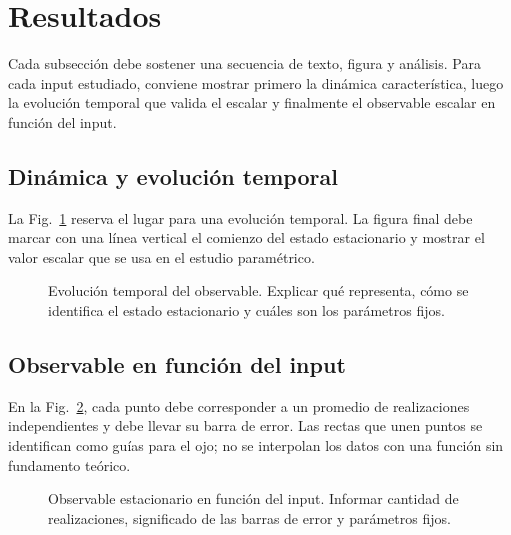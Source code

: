\documentclass[11pt,a4paper]{article}
\begin{document}
\section{Resultados}

Cada subsección debe sostener una secuencia de texto, figura y análisis. Para
cada input estudiado, conviene mostrar primero la dinámica característica,
luego la evolución temporal que valida el escalar y finalmente el observable
escalar en función del input.

\subsection{Dinámica y evolución temporal}

La Fig.~\ref{fig:evolucion} reserva el lugar para una evolución temporal. La
figura final debe marcar con una línea vertical el comienzo del estado
estacionario y mostrar el valor escalar que se usa en el estudio paramétrico.

\begin{figure}[htbp]
  \centering
  \caption{Evolución temporal del observable. Explicar qué representa, cómo
  se identifica el estado estacionario y cuáles son los parámetros fijos.}
  \label{fig:evolucion}
\end{figure}

\subsection{Observable en función del input}

En la Fig.~\ref{fig:estudio-parametrico}, cada punto debe corresponder a un
promedio de realizaciones independientes y debe llevar su barra de error. Las
rectas que unen puntos se identifican como guías para el ojo; no se interpolan
los datos con una función sin fundamento teórico.

\begin{figure}[htbp]
  \centering
  \caption{Observable estacionario en función del input. Informar cantidad de
  realizaciones, significado de las barras de error y parámetros fijos.}
  \label{fig:estudio-parametrico}
\end{figure}

\FloatBarrier
\end{document}
